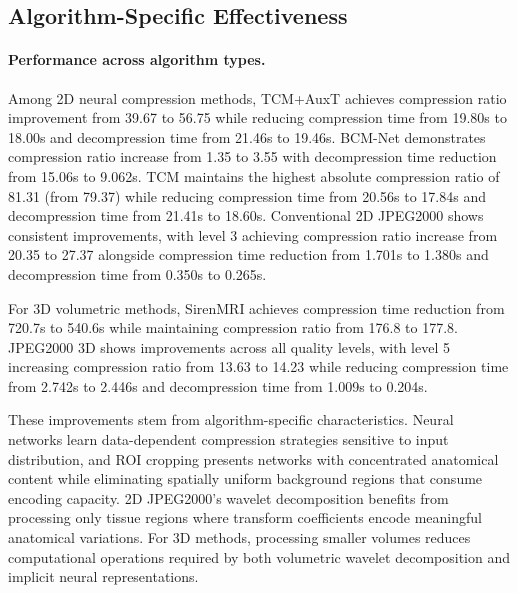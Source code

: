 \documentclass[runningheads]{llncs}
\begin{document}
\subsection{Algorithm-Specific Effectiveness}
\paragraph{Performance across algorithm types.}
Among 2D neural compression methods, TCM+AuxT achieves compression ratio improvement from 39.67 to 56.75 while reducing compression time from 19.80s to 18.00s and decompression time from 21.46s to 19.46s. BCM-Net demonstrates compression ratio increase from 1.35 to 3.55 with decompression time reduction from 15.06s to 9.062s. TCM maintains the highest absolute compression ratio of 81.31 (from 79.37) while reducing compression time from 20.56s to 17.84s and decompression time from 21.41s to 18.60s. Conventional 2D JPEG2000 shows consistent improvements, with level 3 achieving compression ratio increase from 20.35 to 27.37 alongside compression time reduction from 1.701s to 1.380s and decompression time from 0.350s to 0.265s.

For 3D volumetric methods, SirenMRI achieves compression time reduction from 720.7s to 540.6s while maintaining compression ratio from 176.8 to 177.8. JPEG2000 3D shows improvements across all quality levels, with level 5 increasing compression ratio from 13.63 to 14.23 while reducing compression time from 2.742s to 2.446s and decompression time from 1.009s to 0.204s.

These improvements stem from algorithm-specific characteristics. Neural networks learn data-dependent compression strategies sensitive to input distribution, and ROI cropping presents networks with concentrated anatomical content while eliminating spatially uniform background regions that consume encoding capacity. 2D JPEG2000's wavelet decomposition benefits from processing only tissue regions where transform coefficients encode meaningful anatomical variations. For 3D methods, processing smaller volumes reduces computational operations required by both volumetric wavelet decomposition and implicit neural representations.

\vspace{-0.2cm}
\end{document}
